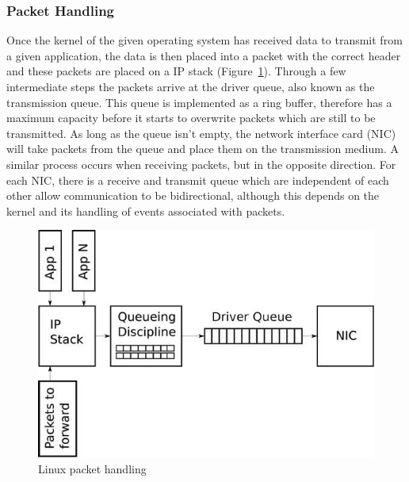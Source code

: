 \documentclass[interim_report.tex]{subfiles}
\begin{document}
\subsubsection{Packet Handling}
\label{subsec:handling}
Once the kernel of the given operating system has received data to transmit from a given application, the data is then placed into a packet with the correct header and these packets are placed on a IP stack (Figure~\ref{fig:buffer}). Through a few intermediate steps the packets arrive at the driver queue, also known as the transmission queue. This queue is implemented as a ring buffer, therefore has a maximum capacity before it starts to overwrite packets which are still to be transmitted. As long as the queue isn't empty, the network interface card (NIC) will take packets from the queue and place them on the transmission medium. A similar process occurs when receiving packets, but in the opposite direction. For each NIC, there is a receive and transmit queue which are independent of each other allow communication to be bidirectional, although this depends on the kernel and its handling of events associated with packets.

\begin{figure}[H]
	\centering
	\includegraphics[width=\textwidth]{img/buffer.jpg}
	\caption{Linux packet handling \cite{buffer}}
	\label{fig:buffer}
\end{figure}
\end{document}
